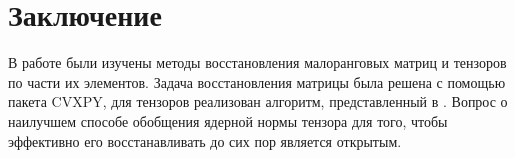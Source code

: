 \section{Заключение}
\par В работе были изучены методы восстановления малоранговых матриц и тензоров по части их элементов. Задача восстановления 
     матрицы была решена с помощью пакета CVXPY, для тензоров реализован алгоритм, представленный в \cite{34}. Вопрос о наилучшем
     способе обобщения ядерной нормы тензора для того, чтобы эффективно его восстанавливать до сих пор является открытым.